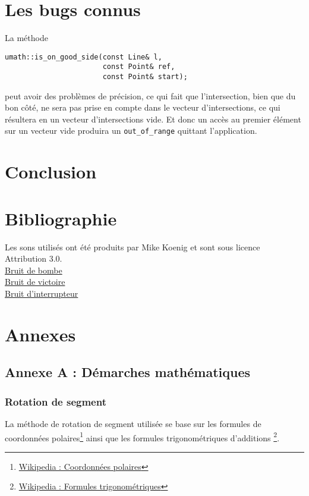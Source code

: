 \documentclass[]{report}
\begin{document}
\section{Les bugs connus}

La méthode 
\begin{lstlisting}
umath::is_on_good_side(const Line& l, 
                       const Point& ref,
                       const Point& start);
\end{lstlisting}
peut avoir des problèmes de précision, ce qui fait que l'intersection, bien que du bon côté, ne sera pas 
prise en compte dans le vecteur d'intersections, ce qui résultera en un vecteur d'intersections vide. Et donc un
accès au premier élément sur un vecteur vide produira un \texttt{out\_of\_range} quittant l'application.


\section{Conclusion}

\section{Bibliographie}

Les sons utilisés ont été produits par Mike Koenig et sont sous licence Attribution 3.0.\\

\href{http://soundbible.com/106-Car-Explosion.html}{Bruit de bombe}   \\
\href{http://soundbible.com/1003-Ta-Da.html}{Bruit de victoire}       \\
\href{http://soundbible.com/761-Switch.html}{Bruit d’interrupteur}    \\

\section{\label{Annexe}Annexes}

\subsection{Annexe A : Démarches mathématiques}

\subsubsection{\label{AnnexeRotation}Rotation de segment}

La méthode de rotation de segment utilisée se base sur les formules
de coordonnées polaires\footnote{\href{http://fr.wikipedia.org/wiki/Coordonn\%C3\%A9es\_polaires}{Wikipedia : Coordonnées polaires}}
ainsi que les formules trigonométriques d'additions
\footnote{\href{http://fr.wikipedia.org/wiki/Trigonom\%C3\%A9trie}{Wikipedia : Formules trigonométriques}}.
\end{document}
